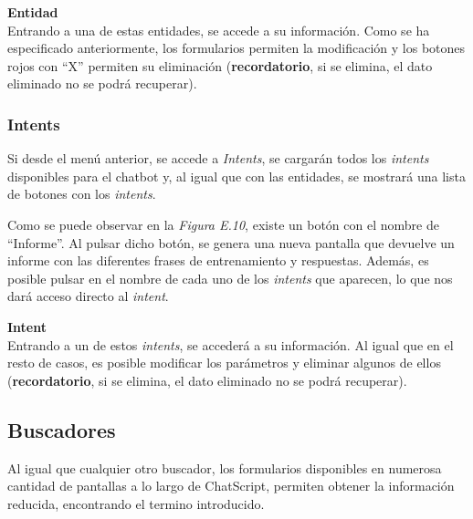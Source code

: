 \textbf{Entidad} \\
Entrando a una de estas entidades, se accede a su información. Como se ha especificado anteriormente, los formularios permiten la modificación y los botones rojos con ``X'' permiten su eliminación (\textbf{recordatorio}, si se elimina, el dato eliminado no se podrá recuperar).
\subsubsection{Intents}
Si desde el menú anterior, se accede a \textit{Intents}, se cargarán todos los \textit{intents} disponibles para el chatbot y, al igual que con las entidades, se mostrará una lista de botones con los \textit{intents}.

Como se puede observar en la \textit{Figura E.10}, existe un botón con el nombre de ``Informe''. Al pulsar dicho botón, se genera una nueva pantalla que devuelve un informe con las diferentes frases de entrenamiento y respuestas. Además, es posible pulsar en el nombre de cada uno de los \textit{intents} que aparecen, lo que nos dará acceso directo al \textit{intent}.

\textbf{Intent} \\
Entrando a un de estos \textit{intents}, se accederá a su información. Al igual que en el resto de casos, es posible modificar los parámetros y eliminar algunos de ellos (\textbf{recordatorio}, si se elimina, el dato eliminado no se podrá recuperar).

\subsection{Buscadores}
Al igual que cualquier otro buscador, los formularios disponibles en numerosa cantidad de pantallas a lo largo de ChatScript, permiten obtener la información reducida, encontrando el termino introducido.


